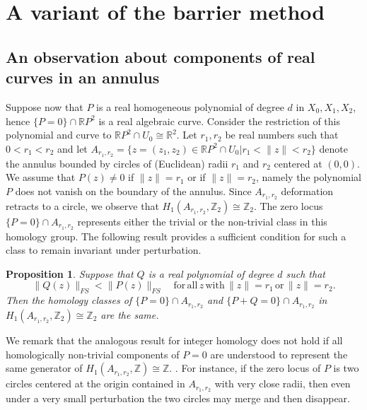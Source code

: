 \documentclass [11pt]{amsart}
\newtheorem {proposition}[theorem]{Proposition}
\theoremstyle{remark}
\numberwithin{equation}{section}
\numberwithin{theorem}{section}
\begin{document}
\section{A variant of the barrier method}
\subsection{An observation about components of real curves in an annulus} \label{annulus}
Suppose now that $P$ is a real homogeneous polynomial of degree $d$ in $X_{0}, X_{1}, X_{2}$, hence $\{P=0\}\cap \mathbb{R}P^2$ is a real algebraic curve. Consider the restriction of this polynomial and curve to $\mathbb{R}P^2\cap U_{0}\cong \mathbb{R}^2$. Let $r_{1}, r_{2}$ be real numbers such that $0<r_{1}<r_{2}$ and let $A_{r_{1}, r_{2}}=\{z=(z_{1},z_{2})\in \mathbb{R}P^2\cap U_{0}| r_{1}<\|z\|<r_{2}\}$ denote the annulus bounded by circles of (Euclidean) radii $r_{1}$ and $r_{2}$ centered at $(0,0)$. We assume that $P(z)\neq 0$ if $\|z\|=r_{1}$ or if $\|z\|=r_{2}$, namely the polynomial $P$ does not vanish on the boundary of the annulus.  Since $A_{r_{1}, r_{2}}$ deformation retracts to a circle, we observe that $H_{1}(A_{r_{1}, r_{2}}, \mathbb{Z}_{2})\cong \mathbb{Z}_{2}$. 
The zero locus $\{P=0\}\cap A_{r_{1},r_{2}}$ represents either the trivial or the non-trivial class in this homology group. The following result provides a sufficient condition for such a class to remain invariant under perturbation. 

\begin{proposition} \label{homotopy} 
Suppose that $Q$ is a real polynomial of degree $d$ such that 
\[ \|Q(z)\|_{FS} < \|P(z)\|_{FS} \quad \mathrm{for}\, \mathrm{all} \, z\,  \mathrm{with} \, \|z\|=r_{1}\, \mathrm{or} \, \|z\|=r_{2}. \]  
Then the homology classes of $\{P=0\}\cap A_{r_{1},r_{2}}$ and $\{P+Q=0\}\cap A_{r_{1},r_{2}}$ in $H_{1}(A_{r_{1}, r_{2}}, \mathbb{Z}_{2})\cong \mathbb{Z}_{2}$ are the same.
\end{proposition} 

We remark that the analogous result for integer homology does not hold if all homologically non-trivial components of $P=0$ are understood to represent the same generator of $H_{1}(A_{r_{1}, r_{2}}, \mathbb{Z})\cong \mathbb{Z}$. . For instance, if the zero locus of $P$ is two circles centered at the origin contained in $A_{r_{1},r_{2}}$ with very close radii, then even under a very small perturbation the two circles may merge and then disappear. 
\end{document}

